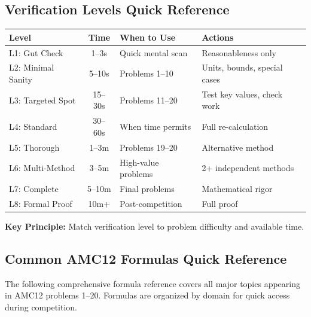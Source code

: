 \documentclass{article}
\begin{document}
\subsection{Verification Levels Quick Reference}

\begin{center}
\begin{tabular}{|l|c|l|l|}
\hline
\textbf{Level} & \textbf{Time} & \textbf{When to Use} & \textbf{Actions} \\
\hline
L1: Gut Check & 1--3s & Quick mental scan & Reasonableness only \\
L2: Minimal Sanity & 5--10s & Problems 1--10 & Units, bounds, special cases \\
L3: Targeted Spot & 15--30s & Problems 11--20 & Test key values, check work \\
L4: Standard & 30--60s & When time permits & Full re-calculation \\
L5: Thorough & 1--3m & Problems 19--20 & Alternative method \\
L6: Multi-Method & 3--5m & High-value problems & 2+ independent methods \\
L7: Complete & 5--10m & Final problems & Mathematical rigor \\
L8: Formal Proof & 10m+ & Post-competition & Full proof \\
\hline
\end{tabular}
\end{center}

\textbf{Key Principle:} Match verification level to problem difficulty and available time.

\subsection{Common AMC12 Formulas Quick Reference}

The following comprehensive formula reference covers all major topics appearing in AMC12 problems 1--20. Formulas are organized by domain for quick access during competition.
\end{document}
